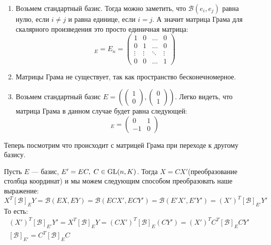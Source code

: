 \documentclass[../main.tex]{subfiles}
\begin{document}
\begin{examples}
  \begin{enumerate}
    \item Возьмем стандартный базис. Тогда можно заметить, что $\mathcal{B}(e_i, e_j)$ равна нулю, если $i \neq j$ и равна единице, если $i = j$. А значит матрица Грама для скалярного произведения это просто единичная матрица:
    \begin{equation*}
      [\mathcal{B}]_E = E_n = \begin{pmatrix}
        1 & 0 & \hdots & 0 \\
        0 & 1 & \hdots & 0 \\
        \vdots & \vdots & \ddots & \vdots \\
        0 & 0 & \hdots & 1
      \end{pmatrix}
    \end{equation*}

    \item Матрицы Грама не существует, так как пространство бесконечномерное.

    \item Возьмем стандартный базис $E = \left(
      \begin{pmatrix}
        1 \\ 0
      \end{pmatrix},
      \begin{pmatrix}
        0 \\ 1
      \end{pmatrix}
    \right)$. Легко видеть, что матрица Грама в данном случае будет равна следующей:
    \begin{equation*}
      [\mathcal{B}]_E = \begin{pmatrix}
        0 & 1 \\
        -1 & 0
      \end{pmatrix}
    \end{equation*}
  \end{enumerate}
\end{examples}

Теперь посмотрим что происходит с матрицей Грама при переходе к другому базису.

Пусть $E$ --- базис, $E' = EC, \; C \in \operatorname{GL}(n, K)$. Тогда $X = CX'$(преобразование столбца координат) и мы можем следующим способом преобразовать наше выражение:
\begin{equation*}
  X^T [\mathcal{B}]_E Y = \mathcal{B}(EX, EY) = \mathcal{B}(ECX', ECY') = \mathcal{B}(E'X', E'Y') = (X')^T [\mathcal{B}]_{E'} Y'
\end{equation*}
То есть:
\begin{equation*}
  \begin{gathered}
    (X')^T [\mathcal{B}]_{E'} Y' = X^T [\mathcal{B}]_E Y = (CX')^T [\mathcal{B}]_E (CY') =
    (X')^T C^T [\mathcal{B}]_E CY' \\
    [\mathcal{B}]_{E'} = C^T [\mathcal{B}]_{E} C
  \end{gathered}
\end{equation*}
\end{document}

